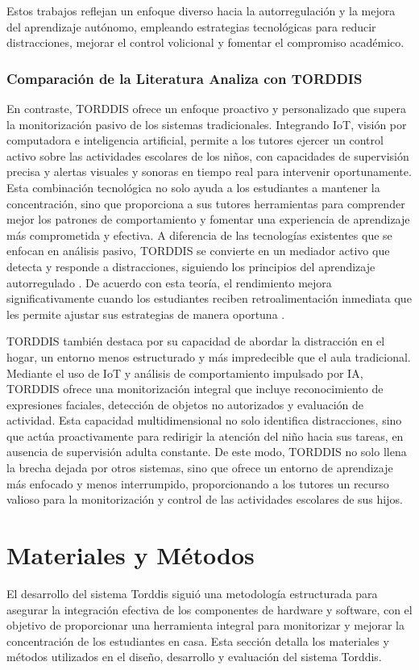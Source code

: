 \documentclass[a4paper,fleqn]{cas-sc}
\begin{document}
	Estos trabajos reflejan un enfoque diverso hacia la autorregulación y la mejora del aprendizaje autónomo, empleando estrategias tecnológicas para reducir distracciones, mejorar el control volicional y fomentar el compromiso académico.
		
	\subsubsection{Comparación de la Literatura Analiza con TORDDIS}
	En contraste, TORDDIS ofrece un enfoque proactivo y personalizado que supera la monitorización pasivo de los sistemas tradicionales. Integrando IoT, visión por computadora e inteligencia artificial, permite a los tutores ejercer un control activo sobre las actividades escolares de los niños, con capacidades de supervisión precisa y alertas visuales y sonoras en tiempo real para intervenir oportunamente. Esta combinación tecnológica no solo ayuda a los estudiantes a mantener la concentración, sino que proporciona a sus tutores herramientas para comprender mejor los patrones de comportamiento y fomentar una experiencia de aprendizaje más comprometida y efectiva. A diferencia de las tecnologías existentes que se enfocan en análisis pasivo, TORDDIS se convierte en un mediador activo que detecta y responde a distracciones, siguiendo los principios del aprendizaje autorregulado \citep{NG201865}. De acuerdo con esta teoría, el rendimiento mejora significativamente cuando los estudiantes reciben retroalimentación inmediata que les permite ajustar sus estrategias de manera oportuna \citep{Taber2024Developing}.
	
	TORDDIS también destaca por su capacidad de abordar la distracción en el hogar, un entorno menos estructurado y más impredecible que el aula tradicional. Mediante el uso de IoT y análisis de comportamiento impulsado por IA, TORDDIS ofrece una monitorización integral que incluye reconocimiento de expresiones faciales, detección de objetos no autorizados y evaluación de actividad. Esta capacidad multidimensional no solo identifica distracciones, sino que actúa proactivamente para redirigir la atención del niño hacia sus tareas, en ausencia de supervisión adulta constante. De este modo, TORDDIS no solo llena la brecha dejada por otros sistemas, sino que ofrece un entorno de aprendizaje más enfocado y menos interrumpido, proporcionando a los tutores un recurso valioso para la monitorización y control de las actividades escolares de sus hijos.
		
	\section{Materiales y Métodos}
	\label{seccion:Cuatro}
	El desarrollo del sistema Torddis siguió una metodología estructurada para asegurar la integración efectiva de los componentes de hardware y software, con el objetivo de proporcionar una herramienta integral para monitorizar y mejorar la concentración de los estudiantes en casa. Esta sección detalla los materiales y métodos utilizados en el diseño, desarrollo y evaluación del sistema Torddis.
	
\end{document}
